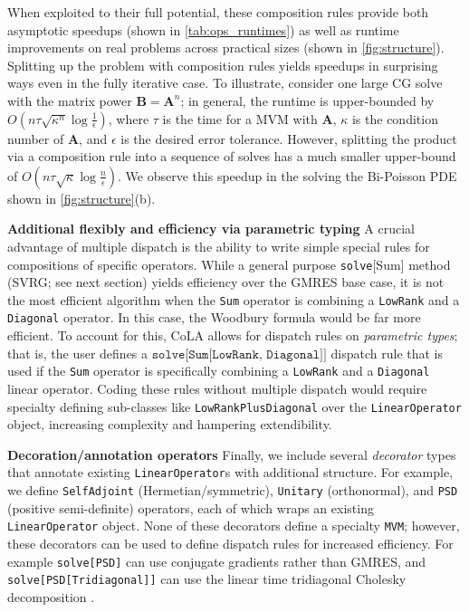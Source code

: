 \documentclass{article}
\newcommand{\mbf}[1]{{\boldsymbol{\mathbf{#1}}}}
\renewcommand{\bm}{\mbf}
\begin{document}
When exploited to their full potential, these composition rules provide both asymptotic speedups (shown in \autoref{tab:ops_runtimes}) as well as runtime improvements on real problems across practical sizes (shown in \autoref{fig:structure}). Splitting up the problem with composition rules yields speedups in surprising ways even in the fully iterative case.
To illustrate, consider one large CG solve with the matrix power $\bm B=\bm A^n$; in general, the runtime is upper-bounded by $O(n\tau \sqrt{\kappa^{n}} \log \tfrac{1}{\epsilon})$, where $\tau$ is the time for a MVM with $\bm A$, $\kappa$ is the condition number of $\bm A$, and $\epsilon$ is the desired error tolerance.
However, splitting the product via a composition rule into a sequence of solves has a much smaller upper-bound of $O(n\tau\sqrt{\kappa}\log \tfrac{n}{\epsilon})$. We observe this speedup in the solving the Bi-Poisson PDE shown in \autoref{fig:structure}(b).

\textbf{Additional flexibly and efficiency via parametric typing} \quad
A crucial advantage of multiple dispatch is the ability to write simple special rules for compositions of specific operators.
While a general purpose \texttt{solve}[Sum] method (SVRG; see next section) yields efficiency over the GMRES base case,
it is not the most efficient algorithm when the \texttt{Sum} operator is combining a \texttt{LowRank} and a \texttt{Diagonal} operator.
In this case, the Woodbury formula would be far more efficient.
To account for this, CoLA allows for dispatch rules on \emph{parametric types};
that is, the user defines a $\texttt{solve[Sum[LowRank, Diagonal]]}$ dispatch rule that is used if the \texttt{Sum} operator is specifically combining a \texttt{LowRank} and a \texttt{Diagonal} linear operator.
Coding these rules without multiple dispatch would require
specialty defining sub-classes like \texttt{LowRankPlusDiagonal} over the \texttt{LinearOperator} object, increasing complexity and hampering extendibility.

\textbf{Decoration/annotation operators} \quad
Finally, we include several \emph{decorator} types
that annotate existing \texttt{LinearOperator}s with additional structure.
For example,
we define \texttt{SelfAdjoint} (Hermetian/symmetric), \texttt{Unitary} (orthonormal), and \texttt{PSD} (positive semi-definite) operators,
each of which wraps an existing \texttt{LinearOperator} object.
None of these decorators define a specialty \texttt{MVM};
however, these decorators can be used to define dispatch rules for increased efficiency.
For example \texttt{solve[PSD]} can use conjugate gradients rather than GMRES,
and \texttt{solve[PSD[Tridiagonal]]} can use the linear time tridiagonal Cholesky decomposition \citep[see e.g.,][Sec.~4.3.6]{golub2018matrix}.
\end{document}
